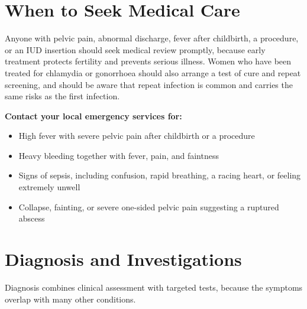 \section*{When to Seek Medical Care}
Anyone with pelvic pain, abnormal discharge, fever after childbirth, a procedure, or an IUD insertion should seek medical review promptly, because early treatment protects fertility and prevents serious illness. Women who have been treated for chlamydia or gonorrhoea should also arrange a test of cure and repeat screening, and should be aware that repeat infection is common and carries the same risks as the first infection.

\textbf{Contact your local emergency services for:}
\begin{itemize}
    \item High fever with severe pelvic pain after childbirth or a procedure
    \item Heavy bleeding together with fever, pain, and faintness
    \item Signs of sepsis, including confusion, rapid breathing, a racing heart, or feeling extremely unwell
    \item Collapse, fainting, or severe one-sided pelvic pain suggesting a ruptured abscess
\end{itemize}

\section*{Diagnosis and Investigations}
Diagnosis combines clinical assessment with targeted tests, because the symptoms overlap with many other conditions.

